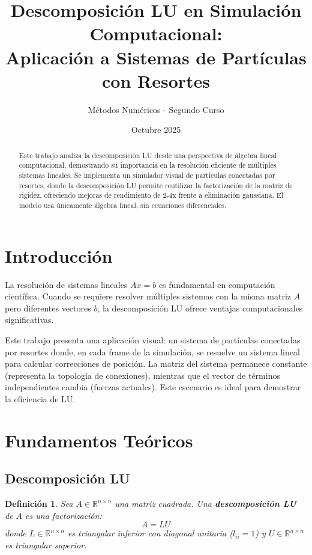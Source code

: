 \documentclass[12pt,a4paper]{article}
\title{Descomposición LU en Simulación Computacional:\\Aplicación a Sistemas de Partículas con Resortes}
\author{Métodos Numéricos - Segundo Curso}
\date{Octubre 2025}
\newtheorem{definition}{Definición}
\begin{document}
\maketitle

\begin{abstract}
Este trabajo analiza la descomposición LU desde una perspectiva de álgebra lineal computacional, demostrando su importancia en la resolución eficiente de múltiples sistemas lineales. Se implementa un simulador visual de partículas conectadas por resortes, donde la descomposición LU permite reutilizar la factorización de la matriz de rigidez, ofreciendo mejoras de rendimiento de 2-4x frente a eliminación gaussiana. El modelo usa únicamente álgebra lineal, sin ecuaciones diferenciales.
\end{abstract}

\section{Introducción}

La resolución de sistemas lineales \(Ax = b\) es fundamental en computación científica. Cuando se requiere resolver múltiples sistemas con la misma matriz \(A\) pero diferentes vectores \(b\), la descomposición LU ofrece ventajas computacionales significativas.

Este trabajo presenta una aplicación visual: un sistema de partículas conectadas por resortes donde, en cada frame de la simulación, se resuelve un sistema lineal para calcular correcciones de posición. La matriz del sistema permanece constante (representa la topología de conexiones), mientras que el vector de términos independientes cambia (fuerzas actuales). Este escenario es ideal para demostrar la eficiencia de LU.

\section{Fundamentos Teóricos}

\subsection{Descomposición LU}

\begin{definition}
Sea \(A \in \mathbb{R}^{n \times n}\) una matriz cuadrada. Una \textbf{descomposición LU} de \(A\) es una factorización:
\[
A = LU
\]
donde \(L \in \mathbb{R}^{n \times n}\) es triangular inferior con diagonal unitaria (\(l_{ii} = 1\)) y \(U \in \mathbb{R}^{n \times n}\) es triangular superior.
\end{definition}
\end{document}
